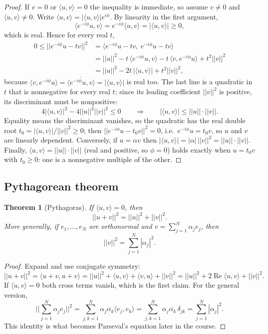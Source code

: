 \documentclass[11pt]{article}
\newcommand{\1}{\mathbf{1}}
\theoremstyle{notestyle}
\newtheorem{theorem}{Theorem}[section]
\theoremstyle{definition}
\begin{document}
\begin{proof}
If $v = 0$ or $\langle u, v\rangle = 0$ the inequality is immediate, so assume
$v \ne 0$ and $\langle u, v\rangle \ne 0$. Write
$\langle u, v\rangle = |\langle u, v\rangle| e^{i\phi}$. By linearity in the first
argument,
$$\langle e^{-i\phi}u, v\rangle = e^{-i\phi}\langle u, v\rangle =
|\langle u, v\rangle| \ge 0,$$
which is real. Hence for every real $t$,
\begin{align*}
0 \le ||e^{-i\phi}u - tv||^2
&= \langle e^{-i\phi}u - tv,\ e^{-i\phi}u - tv\rangle \\
&= ||u||^2 - t\,\langle e^{-i\phi}u, v\rangle - t\,\langle v, e^{-i\phi}u\rangle + t^2||v||^2 \\
&= ||u||^2 - 2t\,|\langle u, v\rangle| + t^2||v||^2,
\end{align*}
because $\langle v, e^{-i\phi}u\rangle = \overline{\langle e^{-i\phi}u, v\rangle}
= |\langle u, v\rangle|$ is real too. The last line is a quadratic in $t$ that is
nonnegative for every real $t$; since its leading coefficient $||v||^2$ is
positive, its discriminant must be nonpositive:
$$4|\langle u, v\rangle|^2 - 4||u||^2||v||^2 \le 0
\qquad\Longrightarrow\qquad |\langle u, v\rangle| \le ||u|| \cdot ||v||.$$
Equality means the discriminant vanishes, so the quadratic has the real double root
$t_0 = |\langle u, v\rangle|/||v||^2 \ge 0$; then $||e^{-i\phi}u - t_0v||^2 = 0$,
i.e.\ $e^{-i\phi}u = t_0v$, so $u$ and $v$ are linearly dependent. Conversely, if
$u = \alpha v$ then $|\langle u, v\rangle| = |\alpha|\,||v||^2 = ||u|| \cdot
||v||$. Finally, $\langle u, v\rangle = ||u|| \cdot ||v||$ (real and positive, so
$\phi = 0$) holds exactly when $u = t_0v$ with $t_0 \ge 0$: one is a nonnegative
multiple of the other.
\end{proof}

\subsection{Pythagorean theorem}
\begin{theorem}[Pythagoras]
\label{thm:pythagoras}
If $\langle u, v\rangle = 0$, then
$$||u + v||^2 = ||u||^2 + ||v||^2.$$
More generally, if $e_1, \dots, e_N$ are orthonormal and $v = \sum_{j=1}^{N}
\alpha_j e_j$, then
$$||v||^2 = \sum_{j=1}^{N} |\alpha_j|^2.$$
\end{theorem}

\begin{proof}
Expand and use conjugate symmetry:
$$||u + v||^2 = \langle u + v, u + v\rangle = ||u||^2 + \langle u, v\rangle +
\langle v, u\rangle + ||v||^2 = ||u||^2 + 2\operatorname{Re}\langle u, v\rangle +
||v||^2.$$
If $\langle u, v\rangle = 0$ both cross terms vanish, which is the first claim.
For the general version,
$$||\sum_{j=1}^{N}\alpha_j e_j||^2 = \sum_{j,k=1}^{N}\alpha_j\overline{\alpha_k}
\langle e_j, e_k\rangle = \sum_{j,k=1}^{N}\alpha_j\overline{\alpha_k}\,\delta_{jk}
= \sum_{j=1}^{N}|\alpha_j|^2.$$
This identity is what becomes Parseval's equation later in the course.
\end{proof}
\end{document}
